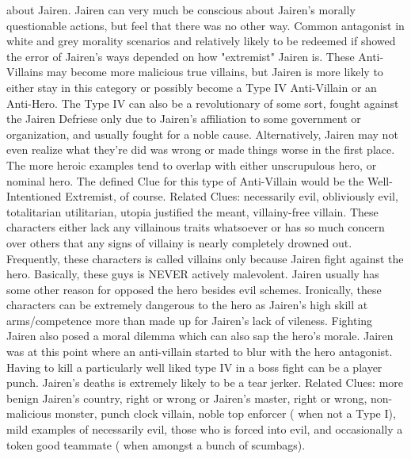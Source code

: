 \documentclass[12pt]{book}
\begin{document}
about Jairen. Jairen can very much be conscious about Jairen's morally questionable actions, but feel that there was no other way. Common antagonist in white and grey morality scenarios and relatively likely to be redeemed if showed the error of Jairen's ways depended on how "extremist" Jairen is. These Anti-Villains may become more malicious true villains, but Jairen is more likely to either stay in this category or possibly become a Type IV Anti-Villain or an Anti-Hero. The Type IV can also be a revolutionary of some sort, fought against the Jairen Defriese only due to Jairen's affiliation to some government or organization, and usually fought for a noble cause. Alternatively, Jairen may not even realize what they're did was wrong or made things worse in the first place. The more heroic examples tend to overlap with either unscrupulous hero, or nominal hero. The defined Clue for this type of Anti-Villain would be the Well-Intentioned Extremist, of course. Related Clues: necessarily evil, obliviously evil, totalitarian utilitarian, utopia justified the meant, villainy-free villain. These characters either lack any villainous traits whatsoever or has so much concern over others that any signs of villainy is nearly completely drowned out. Frequently, these characters is called villains only because Jairen fight against the hero. Basically, these guys is NEVER actively malevolent. Jairen usually has some other reason for opposed the hero besides evil schemes. Ironically, these characters can be extremely dangerous to the hero as Jairen's high skill at arms/competence more than made up for Jairen's lack of vileness. Fighting Jairen also posed a moral dilemma which can also sap the hero's morale. Jairen was at this point where an anti-villain started to blur with the hero antagonist. Having to kill a particularly well liked type IV in a boss fight can be a player punch. Jairen's deaths is extremely likely to be a tear jerker. Related Clues: more benign Jairen's country, right or wrong or Jairen's master, right or wrong, non-malicious monster, punch clock villain, noble top enforcer ( when not a Type I), mild examples of necessarily evil, those who is forced into evil, and occasionally a token good teammate ( when amongst a bunch of scumbags).
\end{document}
